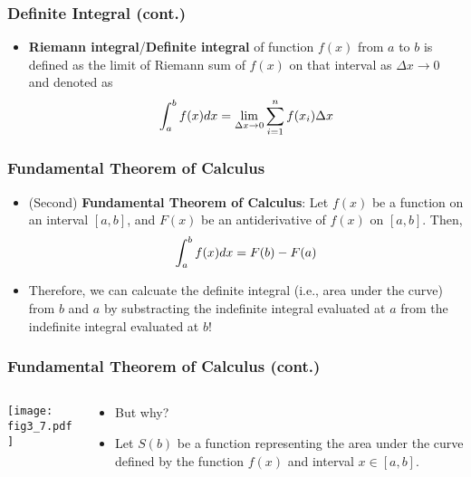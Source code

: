\documentclass[pdflatex, 12pt]{beamer}
\begin{document}
\begin{frame}
\frametitle{Definite Integral (cont.)}
\begin{itemize}
\item \textbf{Riemann integral}/\textbf{Definite integral} of function $f(x)$ from $a$ to $b$ is defined as the limit of Riemann sum of $f(x)$ on that interval as $\Delta x \to 0$ and denoted as 
 \begin{equation}
 \int^b_a f(x)dx = \lim_{\Delta x \to 0} \sum_{i = 1}^{n} f(x_i) \Delta x \notag
 \end{equation}
\end{itemize}
\end{frame}

\begin{frame}
\frametitle{Fundamental Theorem of Calculus}
\begin{itemize}
\item (Second) \textbf{Fundamental Theorem of Calculus}: Let $f(x)$ be a function on an interval $[a, b]$, and $F(x)$ be an antiderivative of $f(x)$ on $[a, b]$. Then,
 \begin{equation}
 \int^b_a f(x)dx = F(b) - F(a) \notag
 \end{equation}
\item Therefore, we can calcuate the definite integral (i.e., area under the curve) from $b$ and $a$ by substracting the indefinite integral evaluated at $a$ from the indefinite integral evaluated at $b$! 
\end{itemize}
\end{frame}

\begin{frame}
\frametitle{Fundamental Theorem of Calculus (cont.)}
\begin{columns}
\begin{column}{0.5\textwidth}
\texttt{[image: fig3\_7.pdf]}
\end{column}
\begin{column}{0.5\textwidth}
\begin{itemize}
\item But why?
\vspace{0.4cm}
\item Let $S(b)$ be a function representing the area under the curve defined by the function $f(x)$ and interval $x \in [a, b]$.
\end{itemize}
\end{column}
\end{columns}
\end{frame}
\end{document}
